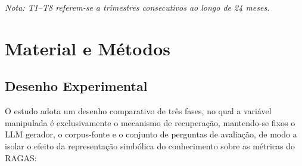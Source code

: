 \documentclass{article}
\begin{document}
	\begin{table}[h]
		\centering
	\end{table}
	
	\noindent \textit{Nota: T1--T8 referem-se a trimestres consecutivos ao longo de 24 meses.}
	
	\newpage
	
	\section{Material e Métodos}
	
	\subsection{Desenho Experimental}
	
	O estudo adota um desenho comparativo de três fases, no qual a variável manipulada é exclusivamente o mecanismo de recuperação, mantendo-se fixos o LLM gerador, o corpus-fonte e o conjunto de perguntas de avaliação, de modo a isolar o efeito da representação simbólica do conhecimento sobre as métricas do RAGAS:
	
\end{document}
